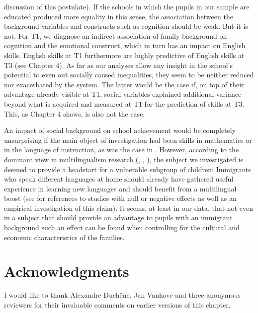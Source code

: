 \documentclass[output=paper]{langsci/langscibook}
\begin{document}
discussion of this postulate). If the schools in which the pupils in our sample are educated produced more equality in this sense, the association between the background variables and constructs such as cognition should be weak. But it is not. For T1, we diagnose an indirect association of family background on cognition and the emotional construct, which in turn has an impact on English skills. English skills at T1 furthermore are highly predictive of English skills at T3 (see Chapter 4). As far as our analyses allow any insight in the school’s potential to even out socially caused inequalities, they seem to be neither reduced nor exacerbated by the system. The latter would be the case if, on top of their advantage already visible at T1, social variables  explained additional variance beyond what is acquired and measured at T1 for the prediction of skills at T3. This, as Chapter 4 shows, is also not the case.

An impact of social background on school achievement would be completely unsurprising if the main object of investigation had been skills in mathematics or in the language of instruction, as was the case in \citet{Kronig2003}. However, according to the dominant view in multilingualism research (\citealt{Cenoz2003}, \citealt{HerdinaJessner2002}, \citealt{Montanari2019}), the subject we investigated is deemed to provide a headstart for a vulnerable subgroup of children: Immigrants who speak different languages at home should already have  gathered useful experience in learning new languages and should benefit from a multilingual boost (see \citealt{BertheleUdry2019} for references to studies with null or negative effects as well as an empirical investigation of this claim). It seems, at least in our data, that not even in a subject that should provide an advantage to pupils with an immigrant background such an effect can be found when controlling for the cultural and economic characteristics of the families.


\section*{Acknowledgments}
I would like to thank Alexandre Duchêne, Jan Vanhove and three anonymous reviewers for their invaluable comments on earlier versions of this chapter.

{\sloppy\printbibliography[heading=subbibliography,notkeyword=this]}
\end{document}

